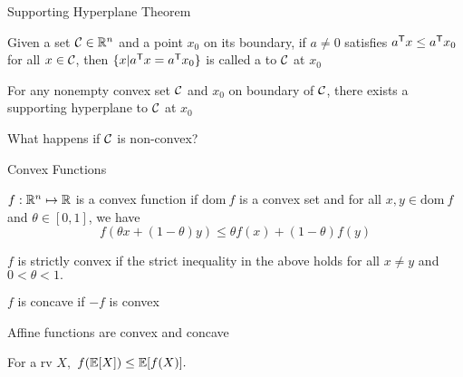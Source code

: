 \documentclass[handout,fleqn,aspectratio=169]{beamer}
\begin{document}
\begin{frame}{Supporting Hyperplane Theorem}


\plitemsep 0.1in

\bci 

\item Given a set $\mathcal C\in{\mathbb R}^{n}$ and a point $x_{0}$ on its
  boundary, if $a\neq 0$ satisfies ${a}^{\mathsf{T}}x \leq {a}^{\mathsf{T}}x_{0}$ for all
  $x\in \mathcal C$, then $\{x|{a}^{\mathsf{T}}x={a}^{\mathsf{T}}x_{0}\}$ is called a  to $\mathcal C$ at $x_{0}$
  
\item For any nonempty convex set $\mathcal C$ and  $x_{0}$ on
  boundary of $\mathcal C$, there exists a supporting hyperplane to $\mathcal C$ at
  $x_{0}$

\item What happens if $\mathcal C$ is non-convex?

\eci
\end{frame}

\begin{frame}{Convex Functions}

\plitemsep 0.1in

\bci 

\item $f:{\mathbb R}^{n} \mapsto {\mathbb R}$ is a {\blue convex function} if
$\text{dom} \ f$ is a convex set and for all $x,y\in \text{dom} \ f$ and
$\theta\in[0,1]$, we have
\[
f(\theta x+(1-\theta)y) \leq \theta f(x) + (1-\theta)f(y)
\]

\item $f$ is {\blue strictly convex} if the strict inequality in the above holds for all
$x\neq y$ and $0<\theta<1.$

\eci
{}
{
\bci

\item $f$ is {\blue concave} if $-f$ is convex


\item Affine functions are convex and concave


\item {} For a rv $X,$ $f(\mathbb{E}[ X ]) \leq \mathbb{E}[ f(X) ].$

\eci
}
{
\vspace{-0.4cm}
}

\end{frame}
\end{document}
